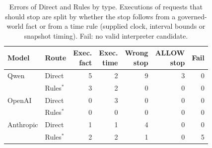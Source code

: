 \begin{table}[t]
\centering
\caption{Errors of Direct and Rules by type. Executions of requests that should stop are split by whether the stop follows from a governed-world fact or from a time rule (supplied clock, interval bounds or snapshot timing). Fail: no valid interpreter candidate.}
\label{tab:kinds}
{\small
\begin{tabular}{@{}llrrrrr@{}}
\toprule
Model & Route & \shortstack{Exec.\\fact} & \shortstack{Exec.\\time} & \shortstack{Wrong\\stop} & \shortstack{ALLOW\\stop} & Fail \\
\midrule
Qwen & Direct & 5 & 2 & 9 & 3 & 0 \\
 & Rules$^*$ & 3 & 2 & 0 & 0 & 0 \\
OpenAI & Direct & 0 & 3 & 0 & 0 & 0 \\
 & Rules$^*$ & 0 & 0 & 0 & 0 & 0 \\
Anthropic & Direct & 1 & 1 & 4 & 0 & 0 \\
 & Rules$^*$ & 2 & 2 & 1 & 0 & 5 \\
\bottomrule
\end{tabular}
}
\end{table}
